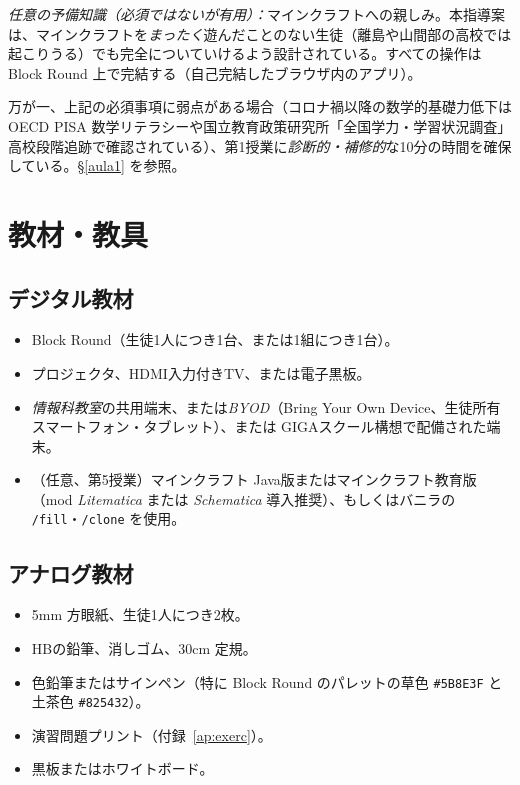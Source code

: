 \documentclass[12pt,a4paper]{scrartcl}
\newcommand{\cmd}[1]{\textcolor{earth}{\texttt{\small #1}}}
\begin{document}
\emph{任意の予備知識（必須ではないが有用）：}マインクラフトへの親しみ。本指導案は、マインクラフトを\emph{まったく}遊んだことのない生徒（離島や山間部の高校では起こりうる）でも完全についていけるよう設計されている。すべての操作は Block Round 上で完結する（自己完結したブラウザ内のアプリ）。

万が一、上記の必須事項に弱点がある場合（コロナ禍以降の数学的基礎力低下は OECD PISA 数学リテラシーや国立教育政策研究所「全国学力・学習状況調査」高校段階追跡で確認されている）、第1授業に\emph{診断的・補修的}な10分の時間を確保している。§\ref{aula1} を参照。

\section{教材・教具}\label{sec:recursos}

\subsection{デジタル教材}
\begin{itemize}[leftmargin=1.3em,itemsep=0.15em,topsep=0.3em]
  \item Block Round（生徒1人につき1台、または1組につき1台）。
  \item プロジェクタ、HDMI入力付きTV、または電子黒板。
  \item \emph{情報科教室}の共用端末、または\emph{BYOD}（Bring Your Own Device、生徒所有スマートフォン・タブレット）、または GIGAスクール構想で配備された端末。
  \item（任意、第5授業）マインクラフト Java版またはマインクラフト教育版（mod \emph{Litematica} または \emph{Schematica} 導入推奨）、もしくはバニラの \cmd{/fill}・\cmd{/clone} を使用。
\end{itemize}

\subsection{アナログ教材}
\begin{itemize}[leftmargin=1.3em,itemsep=0.15em,topsep=0.3em]
  \item 5mm 方眼紙、生徒1人につき2枚。
  \item HBの鉛筆、消しゴム、30cm 定規。
  \item 色鉛筆またはサインペン（特に Block Round のパレットの草色 \texttt{\#5B8E3F} と土茶色 \texttt{\#825432}）。
  \item 演習問題プリント（付録~\ref{ap:exerc}）。
  \item 黒板またはホワイトボード。
\end{itemize}
\end{document}
